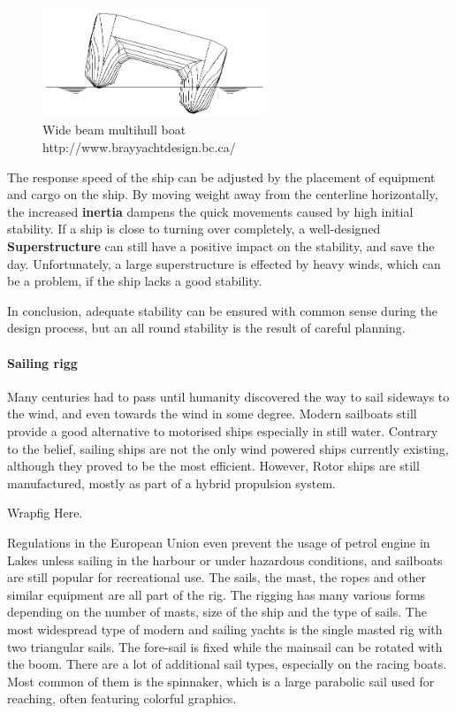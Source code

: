 \begin{figure}[H]
	\centering
	\includegraphics[width=0.6\textwidth]{img3/stability3}
	\caption{Wide beam multihull boat\\http://www.brayyachtdesign.bc.ca/}
	\label{fig:stability3}
\end{figure}

The response speed of the ship can be adjusted by the placement of equipment and cargo on the ship. By moving weight away from the centerline horizontally, the increased \textbf{inertia} dampens the quick movements caused by high initial stability. If a ship is close to turning over completely, a well-designed \textbf{Superstructure} can still have a positive impact on the stability, and save the day. Unfortunately, a large superstructure is effected by heavy winds, which can be a problem, if the ship lacks a good stability.

In conclusion, adequate stability can be ensured with common sense during the design process, but an all round stability is the result of careful planning.

\paragraph{Sailing rigg} 

Many centuries had to pass until humanity discovered the way to sail sideways to the wind, and even towards the wind in some degree. Modern sailboats still provide a good alternative to motorised ships especially in still water. Contrary to the belief, sailing ships are not the only wind powered ships currently existing, although they proved to be the most efficient. However, Rotor ships are still manufactured, mostly as part of a hybrid propulsion system.

Wrapfig Here.

Regulations in the European Union even prevent the usage of petrol engine in Lakes unless sailing in the harbour or under hazardous conditions, and sailboats are still popular for recreational use. The sails, the mast, the ropes and other similar equipment are all part of the rig. The rigging has many various forms depending on the number of masts, size of the ship and the type of sails. The most widespread type of modern and sailing yachts is the single masted rig with two triangular sails. The fore-sail  is fixed while the mainsail can be rotated with the boom. There are a lot of additional sail types, especially on the racing boats. Most common of them is the spinnaker, which is a large parabolic sail used for reaching, often featuring colorful graphics.

